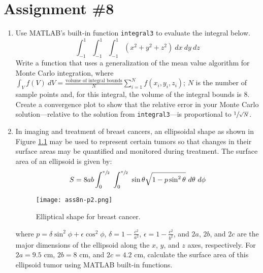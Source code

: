 \chapter{Assignment \#8}
\label{ch:ass8n}

\begin{fullwidth}
\begin{enumerate}
\item Use MATLAB's built-in function \lstinline[style=myMatlab]{integral3} to evaluate the integral below.
\begin{equation*}
\int_{-1}^{1} \int_{-1}^{1} \int_{-1}^{1} \left(x^2 + y^2 + z^2\right) \ dx \ dy \ dz
\end{equation*}
Write a function that uses a generalization of the mean value algorithm for Monte Carlo integration, where $\int_{V}f(V)\ dV = \frac{\text{volume of integral bounds}}{N}\sum\limits_{i=1}^{N}f(x_i,y_i,z_i)$; $N$ is the number of sample points and, for this integral, the volume of the integral bounds is 8.  Create a convergence plot to show that the relative error in your Monte Carlo solution---relative to the solution from \lstinline[style=myMatlab]{integral3}---is proportional to $\sfrac{1}{\sqrt{N}}$.

\vspace{1.0cm}


\item In imaging and treatment of breast cancers, an ellipsoidal shape as shown in Figure \ref{fig:ass8n-p2} may be used to represent certain tumors so that changes in their surface areas may be quantified and monitored during treatment.  The surface area of an ellipsoid is given by:
\begin{equation*}
S = 8ab\int_{0}^{\sfrac{\pi}{2}} \ \int_{0}^{\sfrac{\pi}{2}} \ \sin{\theta}\sqrt{1-p\sin^2{\theta}} \ d\theta \ d\phi
\end{equation*}
\begin{figure}[h!]
\texttt{[image: ass8n-p2.png]}
\caption{Elliptical shape for breast cancer.}
\label{fig:ass8n-p2}
\end{figure}
where $p = \delta \sin^2{\phi} + \epsilon \cos^2{\phi}$, $\delta = 1 - \frac{c^2}{a^2}$, $\epsilon = 1 - \frac{c^2}{b^2}$, and $2a$, $2b$, and $2c$ are the major dimensions of the ellipsoid along the $x$, $y$, and $z$ axes, respectively.  For $2a=9.5$ cm, $2b=8$ cm, and $2c=4.2$ cm, calculate the surface area of this ellipsoid tumor using MATLAB built-in functions.


\vspace{1.0cm}



\end{enumerate}
\end{fullwidth}

